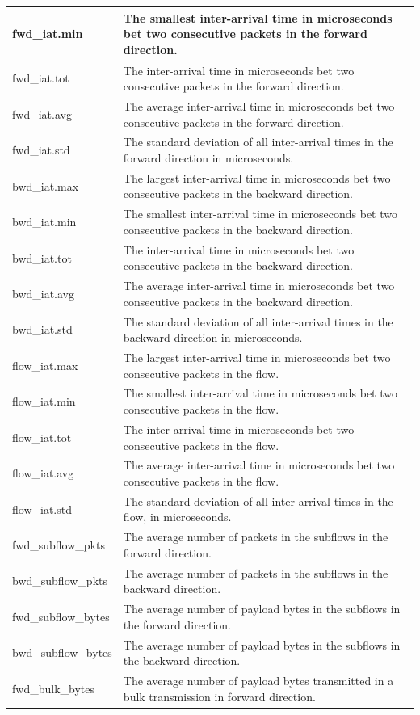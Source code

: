 \documentclass[11pt]{article}
\begin{document}
\begin{table}
\begin{tabular}{|l|p{12cm}|}
    fwd\_iat.min & The smallest inter-arrival time in microseconds bet two consecutive packets in the forward direction. \\
    \hline
    fwd\_iat.tot & The inter-arrival time in microseconds bet two consecutive packets in the forward direction. \\
    \hline
    fwd\_iat.avg & The average inter-arrival time in microseconds bet two consecutive packets in the forward direction. \\
    \hline
    fwd\_iat.std & The standard deviation of all inter-arrival times in the forward direction in microseconds. \\
    \hline
    bwd\_iat.max & The largest inter-arrival time in microseconds bet two consecutive packets in the backward direction. \\
    \hline
    bwd\_iat.min & The smallest inter-arrival time in microseconds bet two consecutive packets in the backward direction. \\
    \hline
    bwd\_iat.tot & The inter-arrival time in microseconds bet two consecutive packets in the backward direction. \\
    \hline
    bwd\_iat.avg & The average inter-arrival time in microseconds bet two consecutive packets in the backward direction. \\
    \hline
    bwd\_iat.std & The standard deviation of all inter-arrival times in the backward direction in microseconds. \\
    \hline
    flow\_iat.max & The largest inter-arrival time in microseconds bet two consecutive packets in the flow. \\
    \hline
    flow\_iat.min & The smallest inter-arrival time in microseconds bet two consecutive packets in the flow. \\
    \hline
    flow\_iat.tot & The inter-arrival time in microseconds bet two consecutive packets in the flow. \\
    \hline
    flow\_iat.avg & The average inter-arrival time in microseconds bet two consecutive packets in the flow. \\
    \hline
    flow\_iat.std & The standard deviation of all inter-arrival times in the flow, in microseconds. \\
    \hline
    fwd\_subflow\_pkts & The average number of packets in the subflows in the forward direction. \\
    \hline
    bwd\_subflow\_pkts & The average number of packets in the subflows in the backward direction. \\
    \hline
    fwd\_subflow\_bytes & The average number of payload bytes in the subflows in the forward direction. \\
    \hline
    bwd\_subflow\_bytes & The average number of payload bytes in the subflows in the backward direction. \\
    \hline
    fwd\_bulk\_bytes & The average number of payload bytes transmitted in a bulk transmission in forward direction. \\
    \hline
  \end{tabular}
\end{table}
\end{document}
